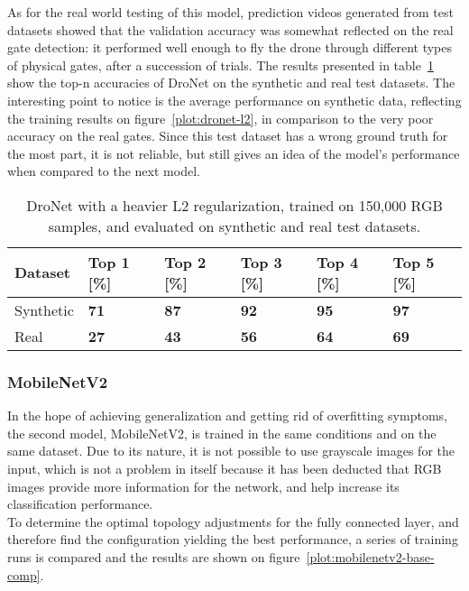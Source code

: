 As for the real world testing of this model, prediction videos generated from
test datasets showed that the validation accuracy was somewhat reflected on the
real gate detection: it performed well enough to fly the drone through
different types of physical gates, after a succession of trials. The results
presented in table~\ref{table:dronet} show the top-n accuracies of DroNet on
the synthetic and real test datasets. The interesting point to notice is the
average performance on synthetic data, reflecting the training results on
figure~\ref{plot:dronet-l2}, in comparison to the very poor accuracy on the real
gates. Since this test dataset has a wrong ground truth for the most part, it
is not reliable, but still gives an idea of the model's performance when
compared to the next model.

\begin{table}[!h]
    \centering
    \caption[Top-N accuracies for DroNet on real and synthetic test
    datasets]{DroNet with a heavier L2 regularization, trained on 150,000 RGB
    samples, and evaluated on synthetic and real test datasets.}
    \begin{tabular}{llllll}
        \toprule
		Dataset & Top 1 [\%] & Top 2 [\%] & Top 3 [\%] & Top 4 [\%] & Top 5 [\%]\\
        \midrule         
        Synthetic & \textbf{71} & \textbf{87} & \textbf{92} & \textbf{95} &
        \textbf{97} \\ 
        Real & \textbf{27} & \textbf{43} & \textbf{56} & \textbf{64} &
        \textbf{69} \\
        \bottomrule
    \end{tabular}
    \label{table:dronet}
\end{table}

\subsubsection{MobileNetV2}

In the hope of achieving generalization and getting rid of overfitting
symptoms, the second model, MobileNetV2, is trained in the same conditions and
on the same dataset. Due to its nature, it is not possible to use grayscale
images for the input, which is not a problem in itself because it has been
deducted that RGB images provide more information for the network, and help
increase its classification performance.\\

To determine the optimal topology adjustments for the fully connected layer,
and therefore find the configuration yielding the best performance, a series of
training runs is compared and the results are shown on
figure~\ref{plot:mobilenetv2-base-comp}.

